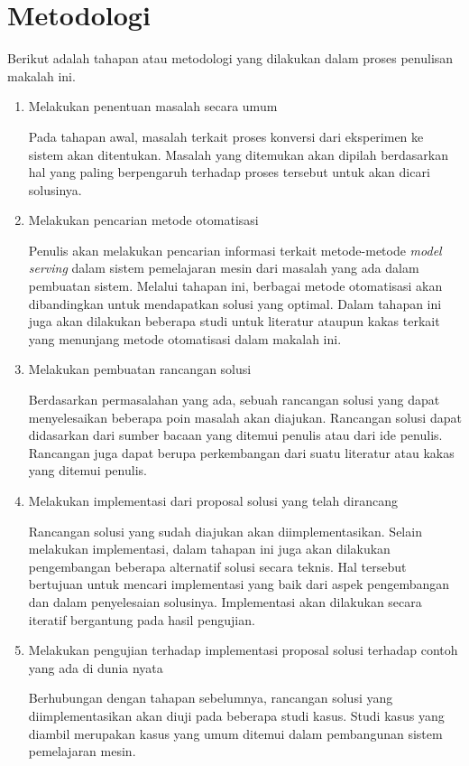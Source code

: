 \section{Metodologi}

Berikut adalah tahapan atau metodologi yang dilakukan dalam proses penulisan makalah ini.

\begin{enumerate}
  \item Melakukan penentuan masalah secara umum
  
  Pada tahapan awal, masalah terkait proses konversi dari eksperimen ke sistem akan ditentukan.
  Masalah yang ditemukan akan dipilah berdasarkan hal yang paling berpengaruh terhadap proses tersebut untuk akan dicari solusinya.

  \item Melakukan pencarian metode otomatisasi 
  
  Penulis akan melakukan pencarian informasi terkait metode-metode \textit{model serving} dalam sistem pemelajaran mesin dari masalah yang ada dalam pembuatan sistem.
  Melalui tahapan ini, berbagai metode otomatisasi akan dibandingkan untuk mendapatkan solusi yang optimal.
  Dalam tahapan ini juga akan dilakukan beberapa studi untuk literatur ataupun kakas terkait yang menunjang metode otomatisasi dalam makalah ini.

  \item Melakukan pembuatan rancangan solusi
  
  Berdasarkan permasalahan yang ada, sebuah rancangan solusi yang dapat menyelesaikan beberapa poin masalah akan diajukan.
  Rancangan solusi dapat didasarkan dari sumber bacaan yang ditemui penulis atau dari ide penulis.
  Rancangan juga dapat berupa perkembangan dari suatu literatur atau kakas yang ditemui penulis.

  \item Melakukan implementasi dari proposal solusi yang telah dirancang
  
  Rancangan solusi yang sudah diajukan akan diimplementasikan.
  Selain melakukan implementasi, dalam tahapan ini juga akan dilakukan pengembangan beberapa alternatif solusi secara teknis.
  Hal tersebut bertujuan untuk mencari implementasi yang baik dari aspek pengembangan dan dalam penyelesaian solusinya.
  Implementasi akan dilakukan secara iteratif bergantung pada hasil pengujian.

  \item Melakukan pengujian terhadap implementasi proposal solusi terhadap contoh yang ada di dunia nyata
  
  Berhubungan dengan tahapan sebelumnya, rancangan solusi yang diimplementasikan akan diuji pada beberapa studi kasus.
  Studi kasus yang diambil merupakan kasus yang umum ditemui dalam pembangunan sistem pemelajaran mesin.
  
\end{enumerate}